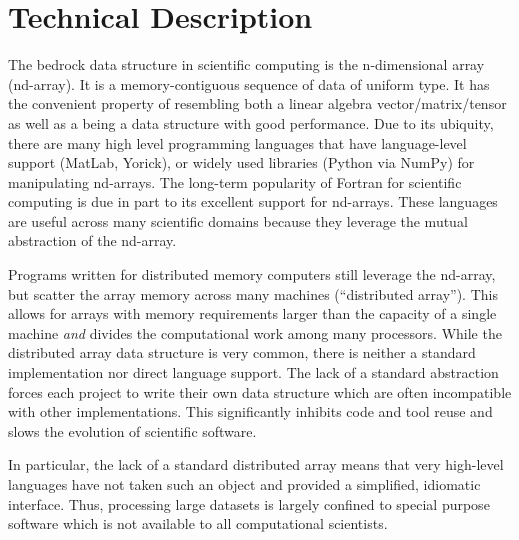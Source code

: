 \documentclass[letterpaper,11pt]{article}
\begin{document}

\section*{Technical Description}

The bedrock data structure in scientific computing is the n-dimensional array (nd-array).  
It is a memory-contiguous sequence of data of uniform type.  It has the convenient property 
of resembling both a linear algebra vector/matrix/tensor as well as a being a data structure
with good performance.  Due to its ubiquity, there are many high level programming 
languages that have language-level support (MatLab\cite{matlab}, Yorick\cite{Munro1995}), 
or widely used libraries (Python\cite{CPython} via NumPy\cite{Oliphant2006}) for 
manipulating nd-arrays.  The long-term popularity of Fortran for scientific computing is 
due in part to its excellent support for nd-arrays.  These languages are useful across 
many scientific domains because they leverage the mutual abstraction of the nd-array.

Programs written for distributed memory computers still leverage the nd-array, but scatter 
the array memory across many machines (``distributed array'').  This allows for arrays 
with memory requirements larger than the capacity of a single machine \emph{and} divides 
the computational work among many processors.  While the distributed array data structure 
is very common, there is neither a standard implementation nor direct language support.  
The lack of a standard abstraction forces each project to write their own data structure 
which are often incompatible with other implementations.  This significantly inhibits code
and tool reuse and slows the evolution of scientific software.

In particular, the lack of a standard distributed array means that very high-level 
languages have not taken such an object and provided a simplified, idiomatic interface.
Thus, processing large datasets is largely confined to special purpose software which is 
not available to all computational scientists.
\end{document}
